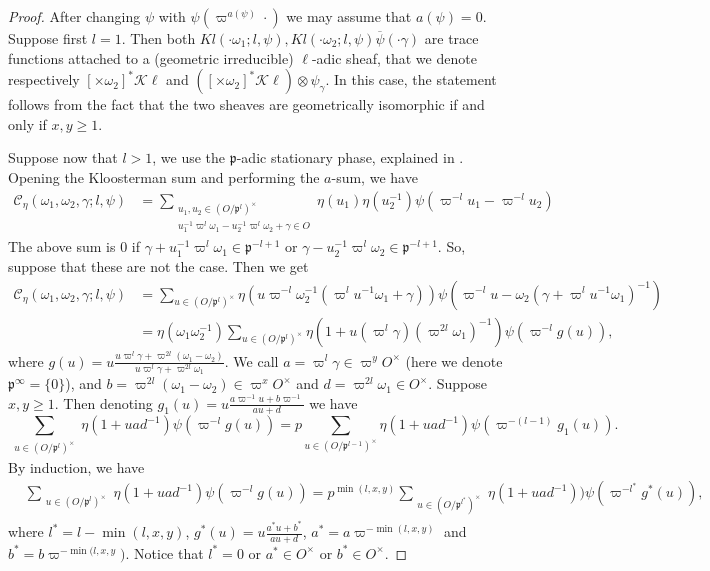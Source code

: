 \documentclass[a4paper,11pt]{amsart}
\theoremstyle{definition}
\begin{document}
    \begin{proof} After changing $\psi$ with $\psi(\varpi^{a(\psi)}\cdot)$ we may assume that $a(\psi)=0$.
    Suppose first $l=1$. Then both $Kl(\cdot \omega_1;l,\psi), {Kl(\cdot \omega_2;l,\psi)}\overline{\psi}(\cdot \gamma)$ are trace functions attached to a (geometric irreducible) $\ell$-adic sheaf, that we denote respectively $[\times \omega_2]^*\mathscr{K}\ell$ and $([\times \omega_2]^*\mathscr{K}\ell)\otimes \psi_{\gamma}$. In this case, the statement follows from the fact that the two sheaves are geometrically isomorphic if and only if $x,y\geq 1$.

    Suppose now that $l >1$, we use the $\mathfrak{p}$-adic stationary phase, explained in \cite[§12.3]{iwaniec2004analytic}. Opening the Kloosterman sum and performing the $a$-sum, we have  \begin{align*}\mathcal{C}_{\eta}(\omega_1,\omega_2,\gamma;l,\psi)&=\sum_{\substack{u_1,u_2\in (O/\mathfrak{p}^{l})^{\times}\\u_1^{-1}\varpi^l\omega_1-u_2^{-1}\varpi^l\omega_2+\gamma \in O}}\eta(u_1)\eta(u_2^{-1})\psi(\varpi^{-l}u_1-\varpi^{-l}u_2)\end{align*}
    The above sum is $0$ if $\gamma+ u_1^{-1}\varpi^{l}\omega_1 \in \mathfrak{p}^{-l+1}$ or $\gamma - u_2^{-1}\varpi^{l}\omega_2 \in \mathfrak{p}^{-l+1}$. So, suppose that these are not the case. Then we get
    \begin{align*}
        \mathcal{C}_{\eta}(\omega_1,\omega_2,\gamma;l,\psi)&=\sum_{u\in (O/\mathfrak{p}^{l})^{\times}}\eta(u\varpi^{-l}\omega_2^{-1}(\varpi^lu^{-1}\omega_1+\gamma))
        \psi(\varpi^{-l}u-\omega_2(\gamma+\varpi^{l}u^{-1}\omega_1)^{-1})\\
        &=\eta(\omega_1\omega_2^{-1})
        \sum_{u\in (O/\mathfrak{p}^l)^{\times}}\eta(1+u(\varpi^{l}\gamma)(\varpi^{2l}\omega_1)^{-1})\psi(\varpi^{-l}g(u)),\end{align*}
        where $g(u) = u\frac{u\varpi^l\gamma+\varpi^{2l}(\omega_1-\omega_2)}{u \varpi^l\gamma+\varpi^{2l}\omega_1}$. 
        We call
 $a = \varpi^{l}\gamma \in \varpi^yO^{\times}$ (here we denote $\mathfrak{p}^{\infty}=\{0\}$), and $b=\varpi^{2l}(\omega_1-\omega_2)\in \varpi^xO^{\times}$ and $d=\varpi^{2l}\omega_1 \in O^{\times}$. Suppose $x,y\geq 1$. Then denoting $g_1(u) = u \frac{a\varpi^{-1}u+b\varpi^{-1}}{au+d}$ we have    \[\sum_{\substack{u\in (O/\mathfrak{p}^l)^{\times}}}\eta(1+uad^{-1})
 \psi(\varpi^{-l}g(u)) = p\sum_{u\in (O/\mathfrak{p}^{l-1})^{\times}}\eta(1+uad^{-1})
 \psi(\varpi^{-(l-1)}g_1(u)).\] By induction, we have  \begin{align*}&\sum_{\substack{u\in (O/\mathfrak{p}^l)^{\times}}}\eta(1+uad^{-1})
 \psi(\varpi^{-l}g(u)) = p^{\min(l,x,y)}\sum_{\substack{u\in (O/\mathfrak{p}^{l^*})^{\times}}}\eta(1+uad^{-1}))
 \psi(\varpi^{-l^*}g^*(u)),\end{align*}where $l^* = l-\min(l,x,y)$, $g^*(u ) = u\frac{a^*u + b^*}{au+d}$, $a^* = a\varpi^{-\min(l,x,y)}$ and $b^*=b\varpi^{-\min(l,x,y})$. Notice that $l^* = 0$ or $a^* \in O^{\times}$ or $b^* \in O^{\times}$. 
 

\end{proof}
\end{document}
